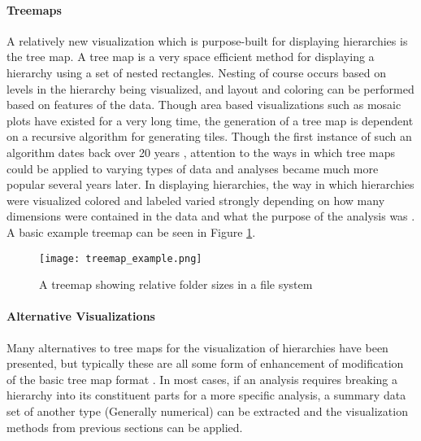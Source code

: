 \paragraph{Treemaps}
A relatively new visualization which is purpose-built for displaying hierarchies is the tree map. A tree map is a very space efficient method for displaying a hierarchy using a set of nested rectangles. Nesting of course occurs based on levels in the hierarchy being visualized, and layout and coloring can be performed based on features of the data. Though area based visualizations such as mosaic plots have existed for a very long time, the generation of a tree map is dependent on a recursive algorithm for generating tiles. Though the first instance of such an algorithm dates back over 20 years \cite{Shneiderman1992}, attention to the ways in which tree maps could be applied to varying types of data and analyses became much more popular several years later. In displaying hierarchies, the way in which hierarchies were visualized colored and labeled varied strongly depending on how many dimensions were contained in the data and what the purpose of the analysis was \cite{Bederson2002}\cite{Schreck2006}. A basic example treemap can be seen in Figure \ref{fig:treemap_ex}.

\begin{figure}
	\centering
	\texttt{[image: treemap\_example.png]}
	\caption{A treemap showing relative folder sizes in a file system \cite{Fry2008}}
	\label{fig:treemap_ex}
\end{figure}

\paragraph{Alternative Visualizations}
Many alternatives to tree maps for the visualization of hierarchies have been presented, but typically these are all some form of enhancement of modification of the basic tree map format \cite{Slingsby2009}. In most cases, if an analysis requires breaking a hierarchy into its constituent parts for a more specific analysis, a summary data set of another type (Generally numerical) can be extracted and the visualization methods from previous sections can be applied.
   



